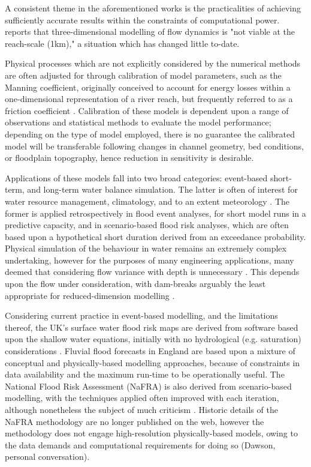 A consistent theme in the aforementioned works is the practicalities of achieving sufficiently accurate results within the constraints of computational power. \citet{Hunter2007} reports that three-dimensional modelling of flow dynamics is "not viable at the reach-scale (1km)," a situation which has changed little to-date.

Physical processes which are not explicitly considered by the numerical methods are often adjusted for through calibration of model parameters, such as the Manning coefficient, originally conceived to account for energy losses within a one-dimensional representation of a river reach, but frequently referred to as a friction coefficient \citep[e.g.][]{Hunter2005,Gallegos2009,Fewtrell2008a}. Calibration of these models is dependent upon a range of observations and statistical methods to evaluate the model performance; depending on the type of model employed, there is no guarantee the calibrated model will be transferable following changes in channel geometry, bed conditions, or floodplain topography, hence reduction in sensitivity is desirable.

Applications of these models fall into two broad categories: event-based short-term, and long-term water balance simulation. The latter is often of interest for water resource management, climatology, and to an extent meteorology \citep[e.g.][]{Gudmundsson2012}. The former is applied retrospectively in flood event analyses, for short model runs in a predictive capacity, and in scenario-based flood risk analyses, which are often based upon a hypothetical short duration derived from an exceedance probability. Physical simulation of the behaviour in water remains an extremely complex undertaking, however for the purposes of many engineering applications, many deemed that considering flow variance with depth is unnecessary \citep{Toro2001}. This depends upon the flow under consideration, with dam-breaks arguably the least appropriate for reduced-dimension modelling \citep{Liang2010}.

Considering current practice in event-based modelling, and the limitations thereof, the UK's surface water flood risk maps are derived from software based upon the shallow water equations, initially with no hydrological (e.g. saturation) considerations \citep{EnvironmentAgency2013}. Fluvial flood forecasts in England are based upon a mixture of conceptual and physically-based modelling approaches, because of constraints in data availability and the maximum run-time to be operationally useful. The National Flood Risk Assessment (NaFRA) is also derived from scenario-based modelling, with the techniques applied often improved with each iteration, although nonetheless the subject of much criticism \citep{PenningRowsell2014}. Historic details of the NaFRA methodology are no longer published on the web, however the methodology does not engage high-resolution physically-based models, owing to the data demands and computational requirements for doing so (Dawson, personal conversation).

